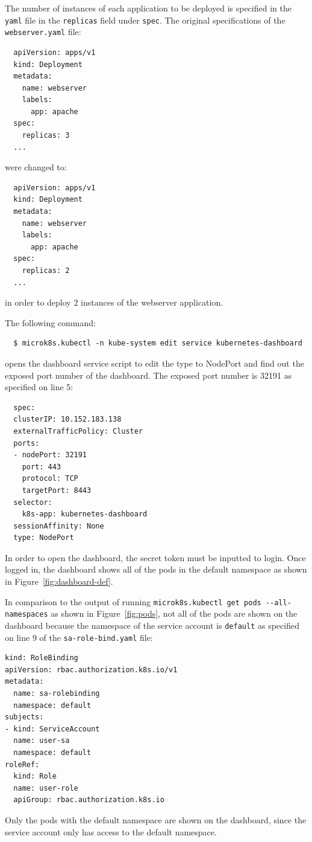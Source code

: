 \documentclass[11pt]{article}
\begin{document}
The number of instances of each application to be deployed is specified in the \verb|yaml| file in the \verb|replicas| field under \verb|spec|.
The original specifications of the \verb|webserver.yaml| file:
\begin{verbatim}
  apiVersion: apps/v1
  kind: Deployment
  metadata:
    name: webserver
    labels:
      app: apache
  spec:
    replicas: 3
  ...
\end{verbatim}
were changed to:
\begin{verbatim}
  apiVersion: apps/v1
  kind: Deployment
  metadata:
    name: webserver
    labels:
      app: apache
  spec:
    replicas: 2
  ...
\end{verbatim}
in order to deploy 2 instances of the webserver application.

The following command:
\begin{verbatim}
  $ microk8s.kubectl -n kube-system edit service kubernetes-dashboard
\end{verbatim}
opens the dashboard service script to edit the type to NodePort and find out the exposed port number of the dashboard.
The exposed port number is 32191 as specified on line 5:
\begin{verbatim}
  spec:
  clusterIP: 10.152.183.138
  externalTrafficPolicy: Cluster
  ports:
  - nodePort: 32191
    port: 443
    protocol: TCP
    targetPort: 8443
  selector:
    k8s-app: kubernetes-dashboard
  sessionAffinity: None
  type: NodePort
\end{verbatim}

In order to open the dashboard, the secret token must be inputted to login. Once logged in,
the dashboard shows all of the pods in the default namespace as shown in Figure~\ref{fig:dashboard-def}.

In comparison to the output of running \verb|microk8s.kubectl get pods --all-namespaces| as shown in Figure~\ref{fig:pods},
not all of the pods are shown on the dashboard because the namespace of the service account is \verb|default| as specified on
line 9 of the \verb|sa-role-bind.yaml| file:
\begin{verbatim}
kind: RoleBinding
apiVersion: rbac.authorization.k8s.io/v1
metadata:
  name: sa-rolebinding
  namespace: default
subjects:
- kind: ServiceAccount
  name: user-sa
  namespace: default
roleRef:
  kind: Role
  name: user-role
  apiGroup: rbac.authorization.k8s.io
\end{verbatim}
Only the pods with the default namespace are shown on the dashboard, since the service account only has access to the default namespace.~\cite{rbac}
\end{document}
